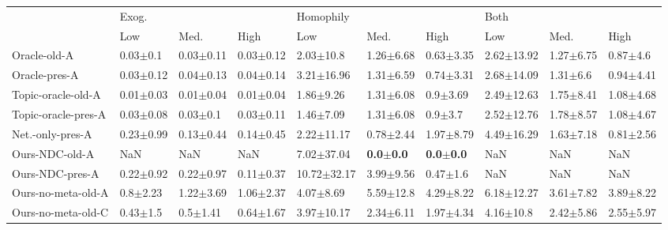 \begin{tabular}{llllllllll}
\toprule
{} & \multicolumn{3}{l}{Exog.} & \multicolumn{3}{l}{Homophily} & \multicolumn{3}{l}{Both} \\
{} &            Low &           Med. &           High &                     Low &                  Med. &                  High &             Low &           Med. &            High \\
\midrule
Oracle-old-A        &   0.03$\pm$0.1 &  0.03$\pm$0.11 &  0.03$\pm$0.12 &           2.03$\pm$10.8 &         1.26$\pm$6.68 &         0.63$\pm$3.35 &  2.62$\pm$13.92 &  1.27$\pm$6.75 &    0.87$\pm$4.6 \\
Oracle-pres-A       &  0.03$\pm$0.12 &  0.04$\pm$0.13 &  0.04$\pm$0.14 &          3.21$\pm$16.96 &         1.31$\pm$6.59 &         0.74$\pm$3.31 &  2.68$\pm$14.09 &   1.31$\pm$6.6 &   0.94$\pm$4.41 \\
Topic-oracle-old-A  &  0.01$\pm$0.03 &  0.01$\pm$0.04 &  0.01$\pm$0.04 &           1.86$\pm$9.26 &         1.31$\pm$6.08 &          0.9$\pm$3.69 &  2.49$\pm$12.63 &  1.75$\pm$8.41 &   1.08$\pm$4.68 \\
Topic-oracle-pres-A &  0.03$\pm$0.08 &   0.03$\pm$0.1 &  0.03$\pm$0.11 &           1.46$\pm$7.09 &         1.31$\pm$6.08 &           0.9$\pm$3.7 &  2.52$\pm$12.76 &  1.78$\pm$8.57 &   1.08$\pm$4.67 \\
Net.-only-pres-A    &  0.23$\pm$0.99 &  0.13$\pm$0.44 &  0.14$\pm$0.45 &          2.22$\pm$11.17 &         0.78$\pm$2.44 &         1.97$\pm$8.79 &  4.49$\pm$16.29 &  1.63$\pm$7.18 &   0.81$\pm$2.56 \\
Ours-NDC-old-A      &            NaN &            NaN &            NaN &          7.02$\pm$37.04 &  \textbf{0.0$\pm$0.0} &  \textbf{0.0$\pm$0.0} &             NaN &            NaN &             NaN \\
Ours-NDC-pres-A     &  0.22$\pm$0.92 &  0.22$\pm$0.97 &  0.11$\pm$0.37 &         10.72$\pm$32.17 &         3.99$\pm$9.56 &          0.47$\pm$1.6 &             NaN &            NaN &             NaN \\
Ours-no-meta-old-A  &   0.8$\pm$2.23 &  1.22$\pm$3.69 &  1.06$\pm$2.37 &           4.07$\pm$8.69 &         5.59$\pm$12.8 &         4.29$\pm$8.22 &  6.18$\pm$12.27 &  3.61$\pm$7.82 &   3.89$\pm$8.22 \\
Ours-no-meta-old-C  &   0.43$\pm$1.5 &   0.5$\pm$1.41 &  0.64$\pm$1.67 &          3.97$\pm$10.17 &         2.34$\pm$6.11 &         1.97$\pm$4.34 &   4.16$\pm$10.8 &  2.42$\pm$5.86 &   2.55$\pm$5.97 \\

\end{tabular}
